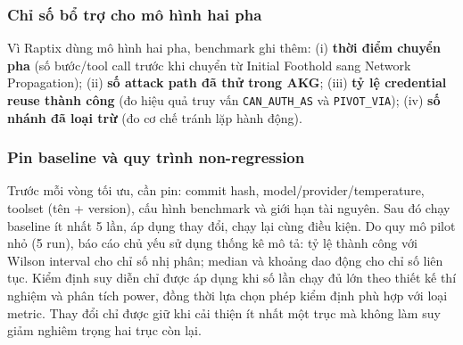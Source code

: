\subsubsection*{Chỉ số bổ trợ cho mô hình hai pha}

Vì Raptix dùng mô hình hai pha, benchmark ghi thêm: (i) \textbf{thời điểm chuyển pha} (số bước/tool call trước khi chuyển từ Initial Foothold sang Network Propagation); (ii) \textbf{số attack path đã thử trong AKG}; (iii) \textbf{tỷ lệ credential reuse thành công} (đo hiệu quả truy vấn \texttt{CAN\_AUTH\_AS} và \texttt{PIVOT\_VIA}); (iv) \textbf{số nhánh đã loại trừ} (đo cơ chế tránh lặp hành động).

\subsubsection*{Pin baseline và quy trình non-regression}

Trước mỗi vòng tối ưu, cần pin: commit hash, model/provider/temperature, toolset (tên + version), cấu hình benchmark và giới hạn tài nguyên. Sau đó chạy baseline ít nhất 5 lần, áp dụng thay đổi, chạy lại cùng điều kiện. Do quy mô pilot nhỏ (5 run), báo cáo chủ yếu sử dụng thống kê mô tả: tỷ lệ thành công với Wilson interval cho chỉ số nhị phân; median và khoảng dao động cho chỉ số liên tục. Kiểm định suy diễn chỉ được áp dụng khi số lần chạy đủ lớn theo thiết kế thí nghiệm và phân tích power, đồng thời lựa chọn phép kiểm định phù hợp với loại metric. Thay đổi chỉ được giữ khi cải thiện ít nhất một trục mà không làm suy giảm nghiêm trọng hai trục còn lại.

